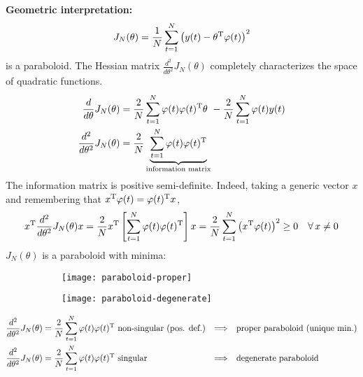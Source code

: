 \textbf{Geometric interpretation:}
\begin{equation*}
J_{N}(\theta) =\frac{1}{N}\sum _{t=1}^{N}\left(y(t) -\theta ^{\mathrm{T}} \varphi (t)\right)^{2}
\end{equation*}
is a paraboloid. The Hessian matrix $ \frac{d^{2}}{d\theta ^{2}} J_{N}(\theta)$ completely characterizes the space of quadratic functions.
\begin{align*}
\frac{d}{d\theta } J_{N}(\theta) & =\frac{2}{N}\sum _{t=1}^{N} \varphi (t) \varphi (t)^{\mathrm{T}} \theta \ -\frac{2}{N}\sum _{t=1}^{N} \varphi (t) y(t)\\
\frac{d^{2}}{d\theta ^{2}} J_{N}(\theta) & =\frac{2}{N}\underbrace{\sum _{t=1}^{N} \varphi (t) \varphi (t)^{\mathrm{T}}}_{\text{information matrix}}
\end{align*}
The information matrix is positive semi-definite. Indeed, taking a generic vector $x$ and remembering that $x^{\mathrm{T}} \varphi (t) =\varphi (t)^{\mathrm{T}} x$,
\[
	x\transpose\frac{d^{2}}{d\theta ^{2}} J_{N}(\theta) x = \frac{2}{N} x\transpose\left[\sum _{t=1}^{N} \varphi (t) \varphi (t)\transpose\right] x=\frac{2}{N}\sum _{t=1}^{N}\left(x\transpose \varphi (t)\right)^{2} \geq 0 \quad \forall x\neq 0
\]
$ J_{N}(\theta)$ is a paraboloid with minima:
\begin{figure}[htpb]
	\centering
	\begin{subfigure}{.5\textwidth}
		\centering
		\texttt{[image: paraboloid-proper]}
		\label{fig:test1}
	\end{subfigure}%
	\begin{subfigure}{.5\textwidth}
		\centering
		\texttt{[image: paraboloid-degenerate]}
		\label{fig:test2}
	\end{subfigure}
\end{figure}
\FloatBarrier
\begin{align*}
\frac{d^{2}}{d\theta ^{2}} J_{N}(\theta) & =\frac{2}{N}\sum _{t=1}^{N} \varphi (t) \varphi (t)^{\mathrm{T}} \text{ non-singular (pos. def.)} & \Longrightarrow\quad& \text{proper paraboloid (unique min.)}\\
\frac{d^{2}}{d\theta ^{2}} J_{N}(\theta) & =\frac{2}{N}\sum _{t=1}^{N} \varphi (t) \varphi (t)^{\mathrm{T}} \text{ singular} &\Longrightarrow\quad& \text{degenerate paraboloid}
\end{align*}